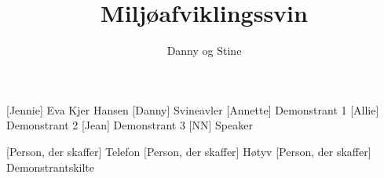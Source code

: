 \documentclass[a4paper,11pt]{article}
\title{Miljøafviklingssvin}
\author{Danny og Stine}
\begin{document}
\maketitle

\begin{roles}
    [Jennie] Eva Kjer Hansen
    [Danny] Svineavler
    [Annette] Demonstrant 1
    [Allie] Demonstrant 2
    [Jean] Demonstrant 3
    [NN] Speaker 
\end{roles}

\begin{props}
    [Person, der skaffer] Telefon 
    [Person, der skaffer] Høtyv
    [Person, der skaffer] Demonstrantskilte
\end{props}
\end{document}
